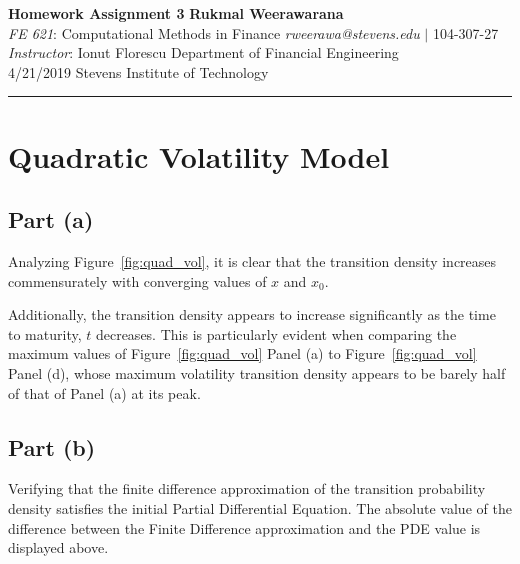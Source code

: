 \documentclass[10pt]{article}
\begin{document}
\thispagestyle{plain}



\noindent
\large\textbf{Homework Assignment 3} \hfill \textbf{Rukmal Weerawarana} \\
\normalsize \textit{FE 621}: Computational Methods in Finance \hfill \textit{rweerawa@stevens.edu} $\mid$ 104-307-27 \\
\textit{Instructor}: Ionut Florescu \hfill Department of Financial Engineering \\
4/21/2019 \hfill Stevens Institute of Technology

\noindent\rule{\linewidth}{.1em}


\section{Quadratic Volatility Model}

\subsection{Part (a)}

Analyzing Figure~\ref{fig:quad_vol}, it is clear that the transition density increases commensurately with converging values of $x$ and $x_0$.

Additionally, the transition density appears to increase significantly as the time to maturity, $t$ decreases. This is particularly evident when comparing the maximum values of Figure~\ref{fig:quad_vol} Panel (a) to Figure~\ref{fig:quad_vol} Panel (d), whose maximum volatility transition density appears to be barely half of that of Panel (a) at its peak.

\subsection{Part (b)}

\begin{table}[!h]
    \centering
\end{table}

Verifying that the finite difference approximation of the transition probability density satisfies the initial Partial Differential Equation. The absolute value of the difference between the Finite Difference approximation and the PDE value is displayed above.
\end{document}
